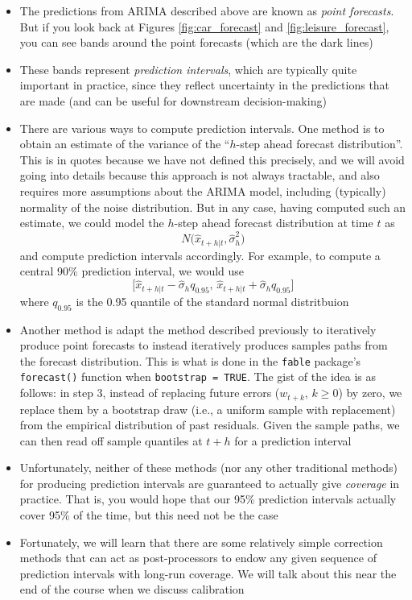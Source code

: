 \documentclass{article}
\begin{document}
\begin{itemize}
\item The predictions  from ARIMA described above are 
    known as \emph{point forecasts}. But if you look back at Figures
    \ref{fig:car_forecast} and \ref{fig:leisure_forecast}, you can see bands
    around the point forecasts (which are the dark lines) 

\item These bands represent \emph{prediction intervals}, which are typically
  quite important in practice, since they reflect uncertainty in the predictions 
  that are made (and can be useful for downstream decision-making)  

\item There are various ways to compute prediction intervals. One method is to
  obtain an estimate  of the variance of the ``$h$-step
  ahead forecast distribution''. This is in quotes because we have not defined
  this precisely, and we will avoid going into details because this approach is
  not always tractable, and also requires more assumptions about the ARIMA
  model, including (typically) normality of the noise distribution. But in any
  case, having computed such an estimate, we could model the $h$-step ahead
  forecast distribution at time $t$ as
  \[
  N\big( \hat{x}_{t+h | t}, \hat\sigma^2_h \big)
  \]
  and compute prediction intervals accordingly. For example, to compute a
  central 90\% prediction interval, we would use 
  \[
  \big[\hat{x}_{t+h | t} - \hat\sigma_h q_{0.95}, \, \hat{x}_{t+h | t} +  
  \hat\sigma_h q_{0.95} \big]
  \]
  where $q_{0.95}$ is the 0.95 quantile of the standard normal distritbuion

\item Another method is adapt the method described previously to iteratively
  produce point forecasts to instead iteratively produces samples paths from the
  forecast distribution. This is what is done in the \verb|fable| package's
  \verb|forecast()| function when \verb|bootstrap = TRUE|. The gist of the idea
  is as follows: in step 3, instead of replacing future errors ($w_{t+k}$, $k
  \geq 0$) by zero, we replace them by a bootstrap draw (i.e., a uniform sample
  with replacement) from the empirical distribution of past residuals. Given the
  sample paths, we can then read off sample quantiles at $t+h$ for a
  prediction interval   

\item Unfortunately, neither of these methods (nor any other traditional
  methods) for producing prediction intervals are guaranteed to actually give
  \emph{coverage} in practice. That is, you would hope that our 95\% prediction 
  intervals actually cover 95\% of the time, but this need not be the case

\item Fortunately, we will learn that there are some relatively simple
  correction methods that can act as post-processors to endow any given sequence
  of prediction intervals with long-run coverage. We will talk about this near the 
  end of the course when we discuss calibration  
\end{itemize}
\end{document}
